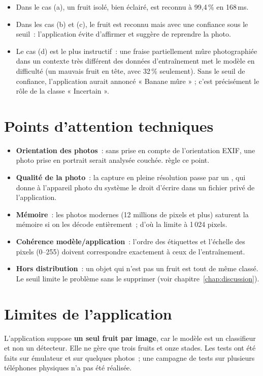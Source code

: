 \begin{itemize}
  \item Dans le cas (a), un fruit isolé, bien éclairé, est reconnu à 99,4\,\% en 168\,ms.
  \item Dans les cas (b) et (c), le fruit est reconnu mais avec une confiance sous le seuil~: l’application évite d’affirmer et suggère de reprendre la photo.
  \item Le cas (d) est le plus instructif~: une fraise partiellement mûre photographiée dans un contexte très différent des données d’entraînement met le modèle en difficulté (un mauvais fruit en tête, avec 32\,\% seulement). Sans le seuil de confiance, l’application aurait annoncé « Banane mûre » ; c’est précisément le rôle de la classe « Incertain ».
\end{itemize}

\section{Points d’attention techniques}

\begin{itemize}
  \item \textbf{Orientation des photos}~: sans prise en compte de l’orientation EXIF, une photo prise en portrait serait analysée couchée.  règle ce point.
  \item \textbf{Qualité de la photo}~: la capture en pleine résolution passe par un , qui donne à l’appareil photo du système le droit d’écrire dans un fichier privé de l’application.
  \item \textbf{Mémoire}~: les photos modernes (12 millions de pixels et plus) saturent la mémoire si on les décode entièrement~; d’où la limite à 1\,024 pixels.
  \item \textbf{Cohérence modèle/application}~: l’ordre des étiquettes et l’échelle des pixels (0--255) doivent correspondre exactement à ceux de l’entraînement.
  \item \textbf{Hors distribution}~: un objet qui n’est pas un fruit est tout de même classé. Le seuil limite le problème sans le supprimer (voir chapitre~\ref{chap:discussion}).
\end{itemize}

\section{Limites de l’application}

L’application suppose \textbf{un seul fruit par image}, car le modèle est un classifieur et non un détecteur. Elle ne gère que trois fruits et onze stades. Les tests ont été faits sur émulateur et sur quelques photos~; une campagne de tests sur plusieurs téléphones physiques n’a pas été réalisée.
